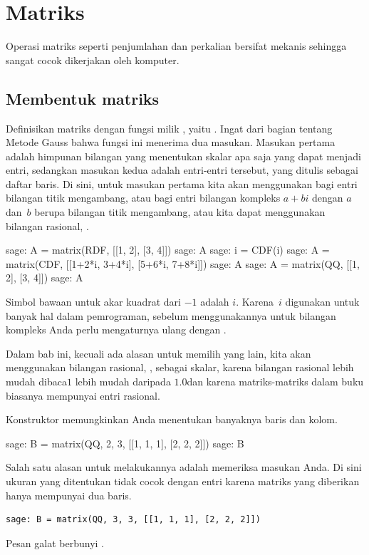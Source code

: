 \chapter{Matriks}

Operasi matriks seperti penjumlahan dan perkalian
bersifat mekanis sehingga sangat cocok dikerjakan oleh
komputer.



\section{Membentuk matriks}
Definisikan matriks dengan fungsi milik \Sage, yaitu .
Ingat dari bagian tentang Metode Gauss bahwa fungsi ini menerima dua masukan.
Masukan pertama adalah himpunan bilangan yang menentukan skalar apa saja
yang dapat menjadi entri, sedangkan masukan kedua adalah entri-entri tersebut,
yang ditulis sebagai daftar baris.
Di sini, untuk masukan pertama kita akan menggunakan  bagi
entri bilangan titik mengambang,
atau  bagi entri bilangan kompleks $a+bi$ dengan
$a$ dan~$b$ berupa bilangan titik mengambang,
atau kita dapat menggunakan bilangan rasional, .
\begin{sagecommandline}
sage: A = matrix(RDF, [[1, 2], [3, 4]])
sage: A
sage: i = CDF(i)
sage: A = matrix(CDF, [[1+2*i, 3+4*i], [5+6*i, 7+8*i]])
sage: A
sage: A = matrix(QQ, [[1, 2], [3, 4]])
sage: A                           
\end{sagecommandline}
Simbol bawaan \Sage{} untuk akar kuadrat dari $-1$ adalah $i$.
Karena~$i$ digunakan untuk banyak hal dalam pemrograman,
sebelum menggunakannya untuk bilangan kompleks Anda perlu
mengaturnya ulang dengan .

Dalam bab ini, kecuali ada alasan untuk memilih yang lain,
kita akan menggunakan bilangan rasional, , sebagai skalar,
karena bilangan rasional lebih mudah dibaca\Dash $1$ lebih mudah daripada
$1.0$\Dash dan karena matriks-matriks dalam buku biasanya mempunyai entri rasional.

Konstruktor  memungkinkan Anda menentukan banyaknya
baris dan kolom.
\begin{sagecommandline}
sage: B = matrix(QQ, 2, 3, [[1, 1, 1], [2, 2, 2]])  
sage: B
\end{sagecommandline}
Salah satu alasan untuk melakukannya adalah memeriksa masukan Anda.
Di sini ukuran yang ditentukan tidak cocok dengan entri karena
matriks yang diberikan hanya mempunyai dua baris.
\begin{lstlisting}[style=python]
sage: B = matrix(QQ, 3, 3, [[1, 1, 1], [2, 2, 2]])  
\end{lstlisting}
Pesan galat \Sage{} berbunyi
.

